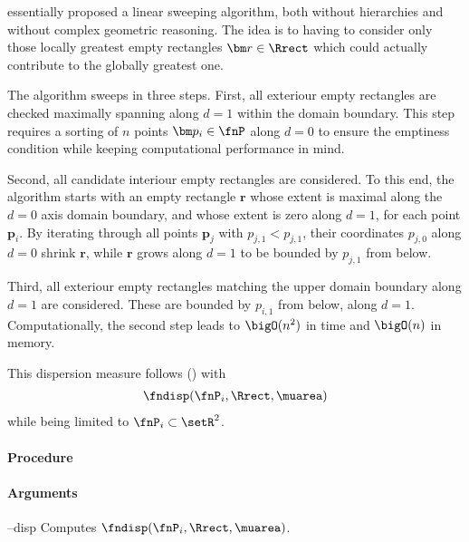 
 essentially proposed a linear sweeping algorithm, both without hierarchies and without complex geometric reasoning. The idea is to having to consider only those locally greatest empty rectangles $\bm r \in \Rrect$ which could actually contribute to the globally greatest one. 

The algorithm sweeps in three steps. First, all exteriour empty rectangles are checked maximally spanning along $d=1$ within the domain boundary. This step requires a sorting of $n$ points $\bm p_i \in \fnP$ along $d=0$ to ensure the emptiness condition while keeping computational performance in mind.

Second, all candidate interiour empty rectangles are considered. To this end, the algorithm starts with an empty rectangle $\bm r$ whose extent is maximal along the $d=0$ axis domain boundary, and whose extent is zero along $d=1$, for each point $\bm p_i$. By iterating through all points $\bm p_j$ with $p_{j,1} < p_{j,1}$, their coordinates $p_{j,0}$ along $d=0$ shrink $\bm r$, while $\bm r$ grows along $d=1$ to be bounded by $p_{j,1}$ from below. 

Third, all exteriour empty rectangles matching the upper domain boundary along $d=1$ are considered. These are bounded by $p_{i,1}$ from below, along $d=1$. Computationally, the second step leads to $\bigO(n^2)$ in time and $\bigO(n)$ in memory. 

This dispersion measure follows () with
\begin{align*}
  \fndisp(\fnP_i, \Rrect, \muarea)
\end{align*}
while being limited to $\fnP_i \subset \setR^2$.

\paragraph{Procedure}

\begin{synopsis}
\end{synopsis}

\paragraph{Arguments}

\begin{procarg}{--disp}
  Computes $\fndisp(\fnP_i, \Rrect, \muarea)$.
\end{procarg}

